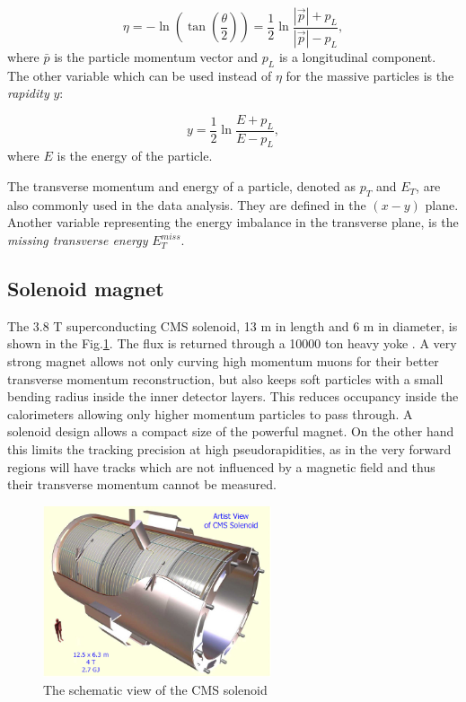 \begin{equation}\label{eq:eta}
  \eta = -\ln(\tan(\frac{\theta}{2})) = \frac{1}{2}\ln\frac{|\vec{p}| + p_{L}}{|\vec{p}| - p_{L}},
\end{equation}
where $\bar{p}$ is the particle momentum vector and $p_{L}$ is a longitudinal component.
The other variable which can be used instead of $\eta$ for the massive particles is the \textit{rapidity} $y$:

\begin{equation}\label{eq:y}
  y = \frac{1}{2}\ln\frac{E + p_{L}}{E - p_{L}},
\end{equation} 
where $E$ is the energy of the particle.

The transverse momentum and energy of a particle, denoted as $p_{T}$ and $E_T$, are also commonly used in the data analysis. 
They are defined in the $(x-y)$ plane. Another variable representing the energy imbalance in the transverse plane, is the
\textit{missing transverse energy} $E_{T}^{miss}$.

\subsection{Solenoid magnet}\label{ssec:solenoid}

The 3.8 T superconducting CMS solenoid, 13 m in length and 6 m in diameter, is shown in the Fig.\ref{fig:solenoid}. 
The flux is returned through a 10000 ton heavy yoke \cite{CMSatLHC}. A very strong magnet allows not only curving
high momentum muons for their better transverse  momentum reconstruction, but also keeps soft particles with a small bending radius
inside the inner detector layers. This reduces occupancy inside the calorimeters allowing only higher
momentum particles to pass through. A solenoid design allows a compact size of the powerful magnet.
On the other hand this limits the tracking precision at high pseudorapidities, as in the very forward regions will have 
tracks which are not influenced by a magnetic field\cite{Dissertori:2010xe} and thus their transverse momentum cannot be measured.


\begin{figure}[t]
  \centering
  \includegraphics[width=0.6\textwidth]{02_experimental_setup/plots/CERN_CMS_Solenoid_schematic.jpg}
  \caption{The schematic view of the CMS solenoid}
  \label{fig:solenoid}
\end{figure}

